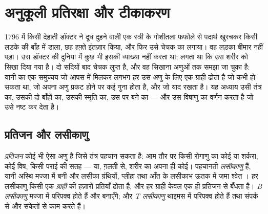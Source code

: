 \chapter{अनुकूली प्रतिरक्षा और टीकाकरण}\label{ch:g12:adaptive-immunity}

1796 में किसी देहाती डॉक्टर ने दूध दुहने वाली एक स्त्री के गोशीतला फफोले से
पदार्थ खुरचकर किसी लड़के की बाँह में डाला, छह हफ़्ते इंतज़ार किया, और फिर
उसे चेचक का  लगाया। वह लड़का बीमार नहीं पड़ा। उस डॉक्टर की दुनिया में
कुछ भी इसकी व्याख्या नहीं करता था; लगता था कि उस शरीर को सिखा दिया गया है।
दो सदियों बाद चेचक लुप्त है, और वह सिखाना अणुओं तक समझा जा चुका है: यानी
 का एक समुच्चय जो आपस में मिलकर लगभग हर उस अणु के लिए एक ग्राही ढोता
है जो कभी हो सकता था, जो अपना अणु प्रकट होने पर कई गुना होता है, और जो याद
रखता है। यह अध्याय उसी तंत्र का, उसकी दो बाँहों का, उसकी स्मृति का, उस पर
बने  का --- और उस विषाणु का वर्णन करता है जो उसे नष्ट कर देता है।

\section{प्रतिजन और लसीकाणु}

\begin{definition}[प्रतिजन, लसीकाणु]\label{def:g12:adaptive-immunity:antigen}
\emph{प्रतिजन} कोई भी ऐसा अणु है जिसे 
तंत्र पहचान सकता है: आम तौर पर किसी रोगाणु का कोई  या शर्करा, कोई
विष, किसी पराई  की सतह --- या, ग़लती से, शरीर का अपना ही कोई। पहचानती
 \emph{लसीकाणु} हैं, यानी अस्थि मज्जा में बनी और
लसीका ग्रंथियों, प्लीहा तथा आँत के लसीकाभ ऊतक में जमा श्वेत । हर
लसीकाणु किसी एक \emph{ग्राही} की हज़ारों प्रतियाँ ढोता है, और हर ग्राही केवल
एक ही प्रतिजन से बँधता है। \emph{B लसीकाणु} मज्जा में परिपक्व होते हैं और
 बनाएँगे; और \emph{T लसीकाणु} थाइमस में परिपक्व होते हैं तथा
संपर्क से और संकेतों से काम करते हैं।
\end{definition}

